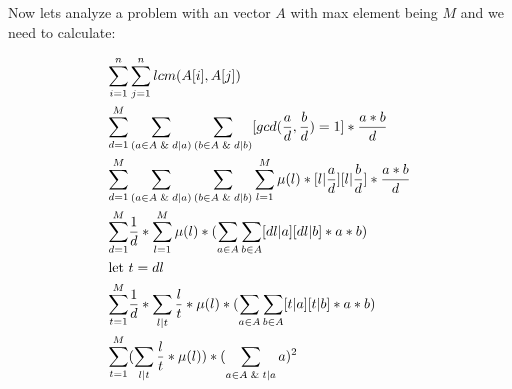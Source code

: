     Now lets analyze a problem with an vector $A$ with max element being $M$ and we need to calculate:


    \begin{align*}
        \sum_{i=1}^{n}& \sum_{j=1}^{n} lcm(A[i],A[j]) \\
        \sum_{d=1}^{M}& \sum_{(a \in A \And d|a)} \sum_{(b \in A \And d|b)} [gcd(\frac{a}{d},\frac{b}{d}) = 1] * \frac{a*b}{d} \\
        \sum_{d=1}^{M}& \sum_{(a \in A \And d|a)} \sum_{(b \in A \And d|b)} \sum_{l=1}^{M} \mu(l) * [l|\frac{a}{d}][l|\frac{b}{d}] * \frac{a*b}{d} \\
        \sum_{d=1}^{M}& \frac{1}{d} * \sum_{l=1}^{M} \mu(l) * ( \sum_{a \in A} \sum_{b \in A} [dl|a][dl|b] * a*b) \\
        \text{let }& t = dl\\
        \sum_{t=1}^{M}& \frac{1}{d} * \sum_{l|t} \frac{l}{t} * \mu(l) * ( \sum_{a \in A} \sum_{b \in A} [t|a][t|b] * a*b) \\
        \sum_{t=1}^{M}&(\sum_{l|t} \frac{l}{t} * \mu(l)) * ( \sum_{a \in A \And t|a} a)^2 
    \end{align*}
    
  